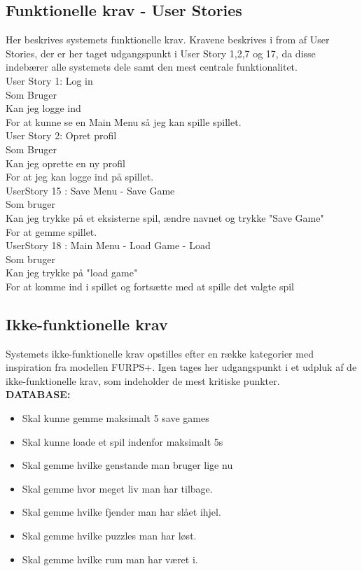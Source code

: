 \subsection{Funktionelle krav - User Stories}
Her beskrives systemets funktionelle krav. Kravene beskrives i from af User Stories, der er her taget udgangspunkt i User Story 1,2,7 og 17, da disse indebærer alle systemets dele samt den mest centrale funktionalitet.\\  
 
User Story 1: Log in \\
  Som Bruger \\
  Kan jeg logge ind \\
  For at kunne se en Main Menu så jeg kan spille spillet. \\
  
User Story 2: Opret profil \\
  Som Bruger \\
  Kan jeg oprette en ny profil \\
  For at jeg kan logge ind på spillet. \\
  
UserStory 15 : Save Menu - Save Game\\
  Som bruger \\
  Kan jeg trykke på et eksisterne spil, ændre navnet og trykke "Save Game" \\
  For at gemme spillet.\\

  
UserStory 18 : Main Menu - Load Game - Load\\
  Som bruger \\
  Kan jeg trykke på "load game" \\
  For at komme ind i spillet og fortsætte med at spille det valgte spil\\


\subsection{Ikke-funktionelle krav}
Systemets ikke-funktionelle krav opstilles efter en række kategorier med inspiration fra modellen FURPS+. Igen tages her udgangspunkt i et udpluk af de ikke-funktionelle krav, som indeholder de mest kritiske punkter.\\

\textbf{DATABASE:}

\begin{itemize}

\item Skal kunne gemme maksimalt 5 save games
\item Skal kunne loade et spil indenfor maksimalt 5s
\item Skal gemme hvilke genstande man bruger lige nu
\item Skal gemme hvor meget liv man har tilbage.
\item Skal gemme hvilke fjender man har slået ihjel.
\item Skal gemme hvilke puzzles man har løst.
\item Skal gemme hvilke rum man har været i.
\end{itemize}

